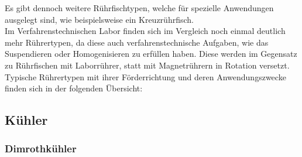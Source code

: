Es gibt dennoch weitere Rührfischtypen, welche für spezielle Anwendungen ausgelegt sind, wie beispielsweise ein Kreuzrührfisch.\\
Im Verfahrenstechnischen Labor finden sich im Vergleich noch einmal deutlich mehr Rührertypen, da diese auch verfahrenstechnische Aufgaben, wie das Suspendieren oder Homogenisieren zu erfüllen haben.
Diese werden im Gegensatz zu Rührfischen mit Laborrührer, statt mit Magnetrührern in Rotation versetzt. Typische Rührertypen mit ihrer Förderrichtung und deren Anwendungszwecke finden sich in der folgenden Übersicht:
\begin{table}[h!]
	\renewcommand*{\arraystretch}{1.2}
	\centering
	\caption{Übersicht Rührertypen}
	\label{tab:ruehrertypen}
\end{table}%
\FloatBarrier

\subsection{Kühler}
\subsubsection*{Dimrothkühler}

